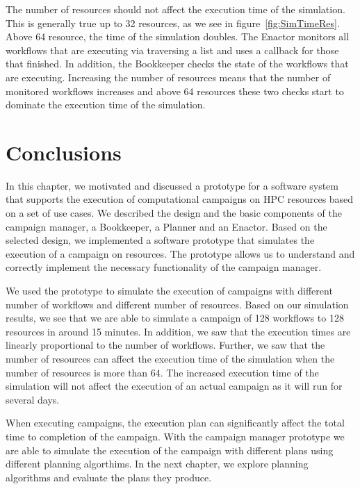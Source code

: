 The number of resources should not affect the execution time of the simulation.
This is generally true up to 32 resources, as we see in figure~\ref{fig:SimTimeRes}.
Above 64 resource, the time of the simulation doubles.
The Enactor monitors all workflows that are executing via traversing a list and uses a callback for those that finished.
In addition, the Bookkeeper checks the state of the workflows that are executing.
Increasing the number of resources means that the number of monitored workflows increases and above 64 resources these two checks start to dominate the execution time of the simulation.


\section{Conclusions}
\label{sec:cm_concl}
In this chapter, we motivated and discussed a prototype for a software system that supports the execution of computational campaigns on HPC resources based on a set of use cases.
We described the design and the basic components of the campaign manager, a Bookkeeper, a Planner and an Enactor.
Based on the selected design, we implemented a software prototype that simulates the execution of a campaign on resources.
The prototype allows us to understand and correctly implement the necessary functionality of the campaign manager.

We used the prototype to simulate the execution of campaigns with different number of workflows and different number of resources.
Based on our simulation results, we see that we are able to simulate a campaign of 128 workflows to 128 resources in around 15 minutes.
In addition, we saw that the execution times are linearly proportional to the number of workflows.
Further, we saw that the number of resources can affect the execution time of the simulation when the number of resources is more than 64.
The increased execution time of the simulation will not affect the execution of an actual campaign as it will run for several days.

When executing campaigns, the execution plan can significantly affect the total time to completion of the campaign.
With the campaign manager prototype we are able to simulate the execution of the campaign with different plans using different planning algorthims.
In the next chapter, we explore planning algorithms and evaluate the plans they produce.


